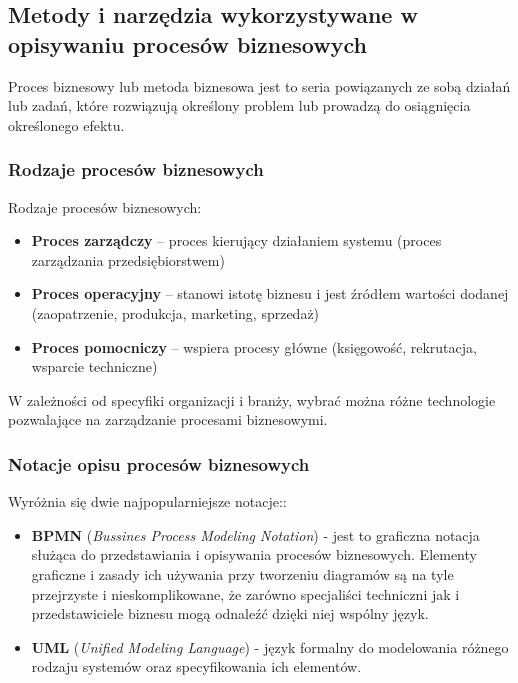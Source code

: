 \subsection{Metody i narzędzia wykorzystywane w opisywaniu procesów biznesowych}

Proces biznesowy lub metoda biznesowa jest to seria powiązanych ze sobą działań lub zadań, które
rozwiązują określony problem lub prowadzą do osiągnięcia określonego efektu.

\subsubsection{Rodzaje procesów biznesowych}

Rodzaje procesów biznesowych:

\begin{itemize}
	\item \textbf{Proces zarządczy} – proces kierujący działaniem systemu (proces zarządzania przedsiębiorstwem)
	\item \textbf{Proces operacyjny} – stanowi istotę biznesu i jest źródłem wartości dodanej (zaopatrzenie, produkcja, marketing, sprzedaż)
	\item \textbf{Proces pomocniczy} – wspiera procesy główne (księgowość, rekrutacja, wsparcie techniczne) \\
\end{itemize}

W zależności od specyfiki organizacji i branży, wybrać można różne technologie pozwalające na zarządzanie procesami biznesowymi.

\subsubsection{Notacje opisu procesów biznesowych}

Wyróżnia się dwie najpopularniejsze notacje::

\begin{itemize}
	\item \textbf{BPMN} (\textit{Bussines Process Modeling Notation}) - jest to graficzna notacja służąca do przedstawiania i opisywania procesów biznesowych. Elementy graficzne i zasady ich używania przy tworzeniu diagramów są na tyle przejrzyste i nieskomplikowane, że zarówno specjaliści techniczni jak i przedstawiciele biznesu mogą odnaleźć dzięki niej wspólny język. 
	\item \textbf{UML} (\textit{Unified Modeling Language}) - język formalny do modelowania różnego rodzaju systemów oraz
	specyfikowania ich elementów. \\
\end{itemize}

